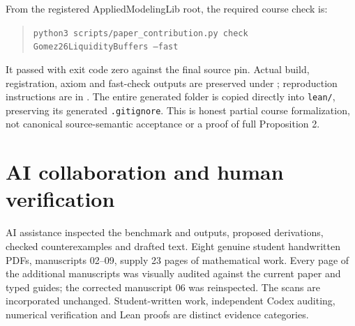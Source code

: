 \documentclass[11pt]{article}
\theoremstyle{definition}
\begin{document}
From the registered AppliedModelingLib root, the required course check is:
\begin{quote}\small
\texttt{python3 scripts/paper\_contribution.py check}\\
\texttt{Gomez26LiquidityBuffers --fast}
\end{quote}
It passed with exit code zero against the final source pin. Actual build, registration, axiom and fast-check outputs are preserved under ; reproduction instructions are in . The entire generated folder is copied directly into \texttt{lean/}, preserving its generated \texttt{.gitignore}. This is honest partial course formalization, not canonical source-semantic acceptance or a proof of full Proposition 2.

\section{AI collaboration and human verification}\label{app:human}
AI assistance inspected the benchmark and outputs, proposed derivations, checked counterexamples and drafted text. Eight genuine student handwritten PDFs, manuscripts 02--09, supply 23 pages of mathematical work. Every page of the additional manuscripts was visually audited against the current paper and typed guides; the corrected manuscript 06 was reinspected. The scans are incorporated unchanged. Student-written work, independent Codex auditing, numerical verification and Lean proofs are distinct evidence categories.
\end{document}
